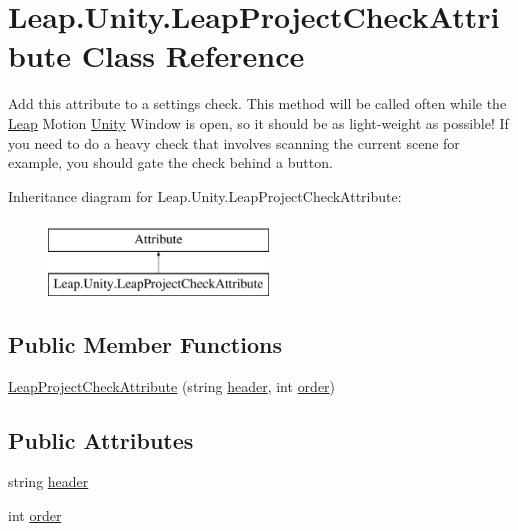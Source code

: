\hypertarget{class_leap_1_1_unity_1_1_leap_project_check_attribute}{}\section{Leap.\+Unity.\+Leap\+Project\+Check\+Attribute Class Reference}
\label{class_leap_1_1_unity_1_1_leap_project_check_attribute}


Add this attribute to a settings check. This method will be called often while the \mbox{\hyperlink{namespace_leap_1_1_unity_1_1_leap}{Leap}} Motion \mbox{\hyperlink{namespace_leap_1_1_unity}{Unity}} Window is open, so it should be as light-\/weight as possible! If you need to do a heavy check that involves scanning the current scene for example, you should gate the check behind a button.  


Inheritance diagram for Leap.\+Unity.\+Leap\+Project\+Check\+Attribute\+:\begin{figure}[H]
\begin{center}
\leavevmode
\includegraphics[height=2.000000cm]{class_leap_1_1_unity_1_1_leap_project_check_attribute}
\end{center}
\end{figure}
\subsection*{Public Member Functions}
\begin{DoxyCompactItemize}
\item 
\mbox{\hyperlink{class_leap_1_1_unity_1_1_leap_project_check_attribute_a10c673a55ffc82f76eb8631b7a7709aa}{Leap\+Project\+Check\+Attribute}} (string \mbox{\hyperlink{class_leap_1_1_unity_1_1_leap_project_check_attribute_a3248d23569bddc48b605c24376cb1be1}{header}}, int \mbox{\hyperlink{class_leap_1_1_unity_1_1_leap_project_check_attribute_a880d57036d1efe9740568ba2f6418a01}{order}})
\end{DoxyCompactItemize}
\subsection*{Public Attributes}
\begin{DoxyCompactItemize}
\item 
string \mbox{\hyperlink{class_leap_1_1_unity_1_1_leap_project_check_attribute_a3248d23569bddc48b605c24376cb1be1}{header}}
\item 
int \mbox{\hyperlink{class_leap_1_1_unity_1_1_leap_project_check_attribute_a880d57036d1efe9740568ba2f6418a01}{order}}
\end{DoxyCompactItemize}


